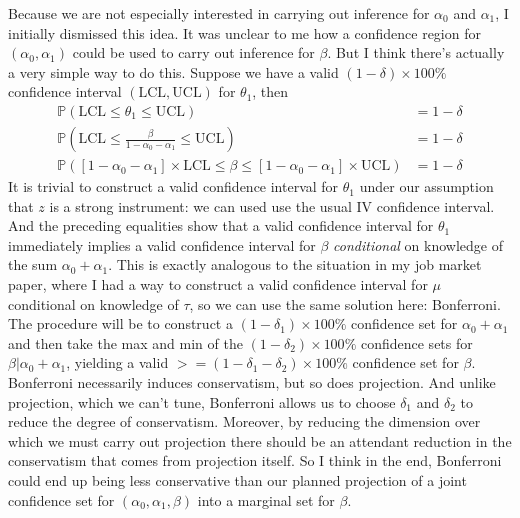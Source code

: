 \documentclass[12pt]{article}
\begin{document}
Because we are not especially interested in carrying out inference for $\alpha_0$ and $\alpha_1$, I initially dismissed this idea.
It was unclear to me how a confidence region for $(\alpha_0, \alpha_1)$ could be used to carry out inference for $\beta$.
But I think there's actually a very simple way to do this.
Suppose we have a valid $(1 - \delta)\times 100\%$ confidence interval $(\mbox{LCL}, \mbox{UCL})$ for $\theta_1$, then
\begin{align*}
  \mathbb{P}\left( \mbox{LCL} \leq \theta_1 \leq \mbox{UCL} \right) &= 1 - \delta\\
  \mathbb{P}\left( \mbox{LCL} \leq \frac{\beta}{1 - \alpha_0 - \alpha_1} \leq \mbox{UCL} \right) &= 1 - \delta\\
  \mathbb{P}\left( \left[ 1 - \alpha_0 - \alpha_1 \right] \times \mbox{LCL} \leq \beta \leq \left[ 1 - \alpha_0 - \alpha_1 \right] \times \mbox{UCL} \right) &= 1 - \delta
\end{align*}
It is trivial to construct a valid confidence interval for $\theta_1$ under our assumption that $z$ is a strong instrument: we can used use the usual IV confidence interval.
And the preceding equalities show that a valid confidence interval for $\theta_1$ immediately implies a valid confidence interval for $\beta$ \emph{conditional} on knowledge of the sum $\alpha_0 + \alpha_1$.
This is exactly analogous to the situation in my job market paper, where I had a way to construct a valid confidence interval for $\mu$ conditional on knowledge of $\tau$, so we can use the same solution here: Bonferroni.
The procedure will be to construct a $(1 - \delta_1)\times 100\%$ confidence set for $\alpha_0 + \alpha_1$ and then take the max and min of the $(1 - \delta_2)\times 100\%$ confidence sets for $\beta|\alpha_0 + \alpha_1$, yielding a valid $>= (1 - \delta_1 - \delta_2)\times 100\%$ confidence set for $\beta$.
Bonferroni necessarily induces conservatism, but so does projection.
And unlike projection, which we can't tune, Bonferroni allows us to choose $\delta_1$ and $\delta_2$ to reduce the degree of conservatism.
Moreover, by reducing the dimension over which we must carry out projection there should be an attendant reduction in the conservatism that comes from projection itself.
So I think in the end, Bonferroni could end up being less conservative than our planned projection of a joint confidence set for $(\alpha_0, \alpha_1, \beta)$ into a marginal set for $\beta$.
\end{document}
